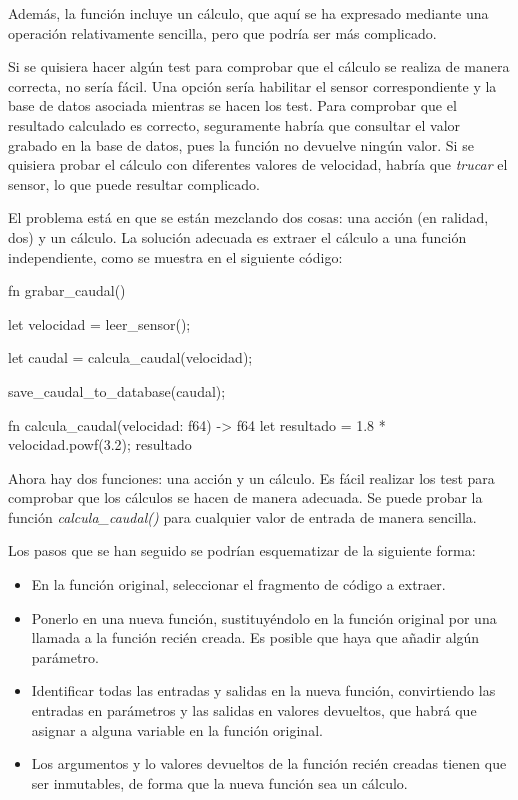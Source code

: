 Además, la función incluye un cálculo, que aquí se ha expresado mediante una operación relativamente sencilla, pero que podría ser más complicado. 

Si se quisiera hacer algún test para comprobar que el cálculo se realiza de manera correcta, no sería fácil. Una opción sería habilitar el sensor correspondiente y la base de datos asociada mientras se hacen los test. Para comprobar que el resultado calculado es correcto, seguramente habría que consultar el valor grabado en la base de datos, pues la función no devuelve ningún valor. Si se quisiera probar el cálculo con diferentes valores de velocidad, habría que \textit{trucar} el sensor, lo que puede resultar complicado.

El problema está en que se están mezclando dos cosas: una acción (en ralidad, dos) y un cálculo. La solución adecuada es extraer el cálculo a una función independiente, como se muestra en el siguiente código:

\vspace{0.7em}
\begin{Codigo}
   fn grabar_caudal() {
      let velocidad = leer_sensor();
      
      let caudal = calcula_caudal(velocidad);
      
      save_caudal_to_database(caudal);
   }
   fn calcula_caudal(velocidad: f64) -> f64 {
      let resultado = 1.8 * velocidad.powf(3.2);
      resultado
   }
\end{Codigo}

Ahora hay dos funciones: una acción y un cálculo. Es fácil realizar los test para comprobar que los cálculos se hacen de manera adecuada. Se puede probar la función \textit{calcula\_caudal()} para cualquier valor de entrada de manera sencilla.

Los pasos que se han seguido se podrían esquematizar de la siguiente forma:
\begin{itemize}
   \item En la función original, seleccionar el fragmento de código a extraer.
   \item Ponerlo en una nueva función, sustituyéndolo en la función original por una llamada a la función recién creada. Es posible que haya que añadir algún parámetro.
   \item Identificar todas las entradas y salidas en la nueva función, convirtiendo las entradas en parámetros y las salidas en valores devueltos, que habrá que asignar a alguna variable en la función original.
   \item Los argumentos y lo valores devueltos de la función recién creadas tienen que ser inmutables, de forma que la nueva función sea un cálculo.
\end{itemize}

